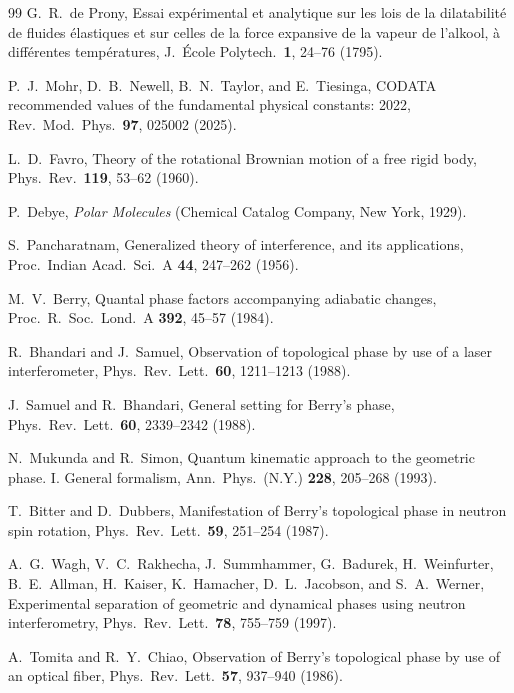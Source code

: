 \documentclass[aps,pra,onecolumn,superscriptaddress,nofootinbib,10pt]{revtex4-2}
\theoremstyle{definition}
\theoremstyle{remark}
\begin{document}
\begin{thebibliography}{99}
 G.~R.~de Prony, Essai exp\'erimental et analytique sur les lois de la dilatabilit\'e de fluides \'elastiques et sur celles de la force expansive de la vapeur de l'alkool, \`a diff\'erentes temp\'eratures, J.\ \'Ecole Polytech.\ \textbf{1}, 24--76 (1795). %

 P.~J.~Mohr, D.~B.~Newell, B.~N.~Taylor, and E.~Tiesinga, CODATA recommended values of the fundamental physical constants: 2022, Rev.\ Mod.\ Phys.\ \textbf{97}, 025002 (2025).

 L.~D.~Favro, Theory of the rotational Brownian motion of a free rigid body, Phys.\ Rev.\ \textbf{119}, 53--62 (1960).

 P.~Debye, \emph{Polar Molecules} (Chemical Catalog Company, New York, 1929).

 S.~Pancharatnam, Generalized theory of interference, and its applications, Proc.\ Indian Acad.\ Sci.\ A \textbf{44}, 247--262 (1956).

 M.~V.~Berry, Quantal phase factors accompanying adiabatic changes, Proc.\ R.\ Soc.\ Lond.\ A \textbf{392}, 45--57 (1984).

 R.~Bhandari and J.~Samuel, Observation of topological phase by use of a laser interferometer, Phys.\ Rev.\ Lett.\ \textbf{60}, 1211--1213 (1988).

 J.~Samuel and R.~Bhandari, General setting for Berry's phase, Phys.\ Rev.\ Lett.\ \textbf{60}, 2339--2342 (1988).

 N.~Mukunda and R.~Simon, Quantum kinematic approach to the geometric phase. I. General formalism, Ann.\ Phys.\ (N.Y.) \textbf{228}, 205--268 (1993).

 T.~Bitter and D.~Dubbers, Manifestation of Berry's topological phase in neutron spin rotation, Phys.\ Rev.\ Lett.\ \textbf{59}, 251--254 (1987).

 A.~G.~Wagh, V.~C.~Rakhecha, J.~Summhammer, G.~Badurek, H.~Weinfurter, B.~E.~Allman, H.~Kaiser, K.~Hamacher, D.~L.~Jacobson, and S.~A.~Werner, Experimental separation of geometric and dynamical phases using neutron interferometry, Phys.\ Rev.\ Lett.\ \textbf{78}, 755--759 (1997).

 A.~Tomita and R.~Y.~Chiao, Observation of Berry's topological phase by use of an optical fiber, Phys.\ Rev.\ Lett.\ \textbf{57}, 937--940 (1986).


\end{thebibliography}
\end{document}
